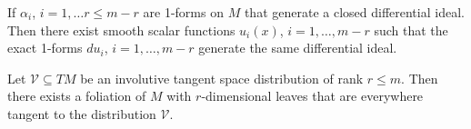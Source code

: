 \begin{definition} \label{def:forms}
\notready
\end{definition}

\begin{definition} \label{def:diff-ideal}
\notready
\end{definition}

\begin{theorem} \label{thm:frob-forms}
If $\alpha_i$, $i=1,\ldots r\le m-r$ are 1-forms on $M$ that generate a closed
differential ideal. Then there exist smooth scalar functions $u_i(x)$,
$i=1,\ldots,m-r$ such that the exact 1-forms $du_i$, $i=1,\ldots,m-r$ generate
the same differential ideal.
\end{theorem}

\begin{definition} \label{def:vec-dist}
\notready
\end{definition}

\begin{definition} \label{def:inv-distr}
\notready
\end{definition}

\begin{theorem} \label{thm:frob-vec}
Let $\mathcal{V} \subseteq TM$ be an involutive tangent space distribution of
rank $r\le m$. Then there exists a foliation of $M$ with $r$-dimensional leaves
that are everywhere tangent to the distribution $\mathcal{V}$.
\end{theorem}
